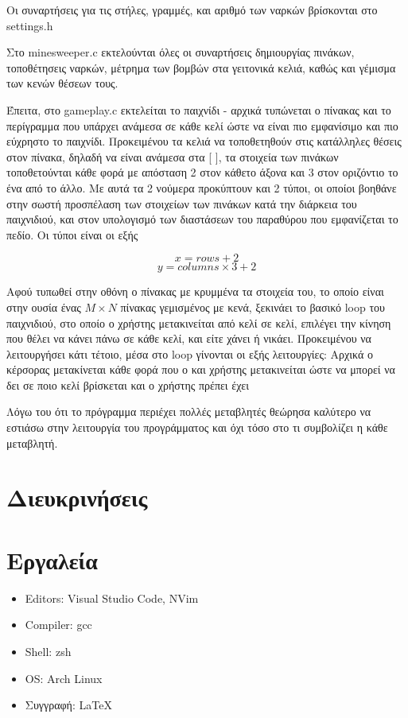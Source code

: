 \documentclass{article}
\begin{document}
    Οι συναρτήσεις για τις στήλες, γραμμές, και αριθμό των ναρκών βρίσκονται στο settings.h  

    Στο minesweeper.c εκτελούνται όλες οι συναρτήσεις δημιουργίας πινάκων, τοποθέτησεις ναρκών,
    μέτρημα των βομβών στα γειτονικά κελιά, καθώς και γέμισμα των κενών θέσεων τους.  

    Έπειτα, στο gameplay.c εκτελείται το παιχνίδι - αρχικά τυπώνεται ο πίνακας και το περίγραμμα που
    υπάρχει ανάμεσα σε κάθε κελί ώστε να είναι πιο εμφανίσιμο και πιο εύχρηστο το παιχνίδι. Προκειμένου
    τα κελιά να τοποθετηθούν στις κατάλληλες θέσεις στον πίνακα, δηλαδή να είναι ανάμεσα στα [ ],
    τα στοιχεία των πινάκων τοποθετούνται κάθε φορά με απόσταση 2 στον κάθετο άξονα και 3 στον οριζόντιο
    το ένα από το άλλο. Με αυτά τα 2 νούμερα προκύπτουν και 2 τύποι, οι οποίοι βοηθάνε στην σωστή
    προσπέλαση των στοιχείων των πινάκων κατά την διάρκεια του παιχνιδιού, και στον υπολογισμό των
    διαστάσεων του παραθύρου που εμφανίζεται το πεδίο. Οι τύποι είναι οι εξής

    \begin{equation}
        x = rows + 2
    \end{equation}
    \begin{equation}
        y = columns \times 3 + 2
    \end{equation}

    Αφού τυπωθεί στην οθόνη ο πίνακας με κρυμμένα τα στοιχεία του, το οποίο είναι στην ουσία ένας 
    $Μ \times N$ πίνακας γεμισμένος με κενά, ξεκινάει το βασικό loop του παιχνιδιού, στο οποίο
    ο χρήστης μετακινείται από κελί σε κελί, επιλέγει την κίνηση που θέλει να κάνει πάνω σε κάθε κελί,
    και είτε χάνει ή νικάει. Προκειμένου να λειτουργήσει κάτι τέτοιο, μέσα στο loop γίνονται οι εξής
    λειτουργίες: Αρχικά ο κέρσορας μετακίνεται κάθε φορά που ο και χρήστης μετακινείται ώστε να μπορεί να δει 
    σε ποιο κελί βρίσκεται και ο χρήστης πρέπει έχει %

    Λόγω του ότι το πρόγραμμα περιέχει πολλές μεταβλητές θεώρησα καλύτερο να εστιάσω
    στην λειτουργία του προγράμματος και όχι τόσο στο τι συμβολίζει η κάθε μεταβλητή.
    

\section{Διευκρινήσεις}



\section{Εργαλεία}

    \begin{itemize}
        \item Editors: Visual Studio Code, NVim
        \item Compiler: gcc
        \item Shell: zsh
        \item OS: Arch Linux
        \item Συγγραφή: \LaTeX
    \end{itemize}
\end{document}
